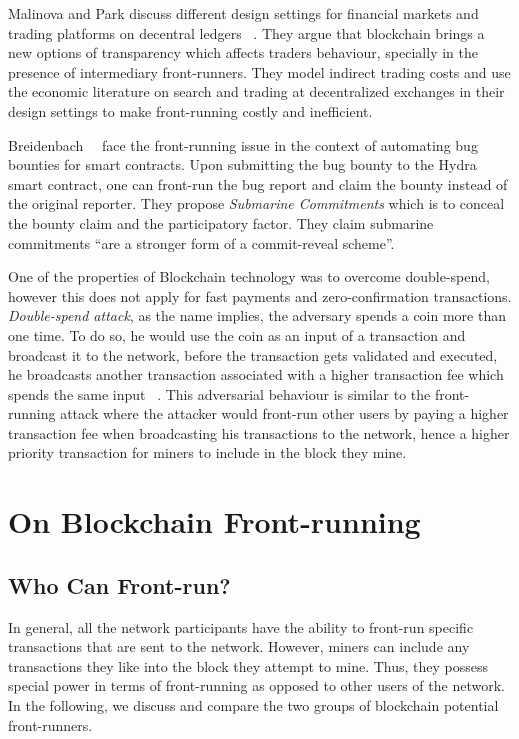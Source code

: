 Malinova and Park discuss different design settings for financial markets and trading platforms on decentral ledgers ~\cite{malinova2017market}.  They argue that blockchain brings a new options of transparency which affects traders behaviour, specially in the presence of intermediary front-runners. They model indirect trading costs and use the economic literature on search and trading at decentralized exchanges in their design settings to make front-running costly and inefficient.


Breidenbach~\etal ~\cite{breidenbach2018enter} face the front-running issue in the context of automating bug bounties for smart contracts. Upon submitting the bug bounty to the Hydra smart contract, one can front-run the bug report and claim the bounty instead of the original reporter. They propose \textit{Submarine Commitments} which is to conceal the bounty claim and the participatory factor. They claim submarine commitments ``are a stronger form of a commit-reveal scheme''. 

 
One of the properties of Blockchain technology was to overcome double-spend, however this does not apply for fast payments and zero-confirmation transactions. \textit{Double-spend attack}, as the name implies, the adversary spends a coin more than one time. To do so, he would use the coin as an input of a transaction and broadcast it to the network, before the transaction gets validated and executed, he broadcasts another transaction associated with a higher transaction fee which spends the same input ~\cite{bamert2013have, karame2012double}. This adversarial behaviour is similar to the front-running attack where the attacker would front-run other users by paying a higher transaction fee when broadcasting his transactions to the network, hence a higher priority transaction for miners to include in the block they mine.  




\section{On Blockchain Front-running}

\subsection{Who Can Front-run?}
\label{sec:who can front-run?}

In general, all the network participants have the ability to front-run specific transactions that are sent to the network. However, miners can include any transactions they like into the block they attempt to mine. Thus, they possess special power in terms of front-running as opposed to other users of the network. In the following, we discuss and compare the two groups of blockchain potential front-runners.

